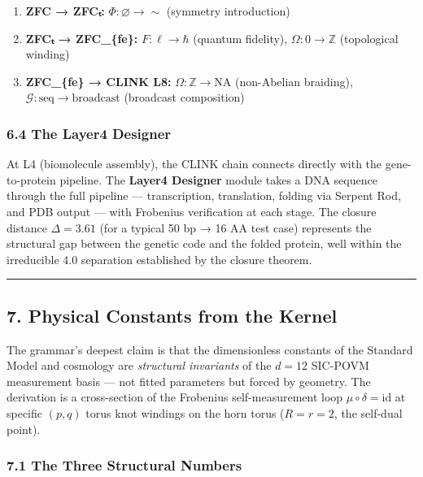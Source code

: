 \documentclass[12pt,a4paper]{article}
\begin{document}
\begin{enumerate}
\def\labelenumi{\arabic{enumi}.}
\tightlist
\item
  \textbf{ZFC → ZFCₜ:} \(\Phi: \varnothing \to \sim\) (symmetry
  introduction)
\item
  \textbf{ZFCₜ → ZFC\_\{fe\}:} \(F: \ell \to \hbar\) (quantum fidelity),
  \(\Omega: 0 \to \mathbb{Z}\) (topological winding)
\item
  \textbf{ZFC\_\{fe\} → CLINK L8:} \(\Omega: \mathbb{Z} \to \text{NA}\)
  (non-Abelian braiding),
  \(\mathcal{G}: \text{seq} \to \text{broadcast}\) (broadcast
  composition)
\end{enumerate}

\hypertarget{the-layer4-designer}{%
\subsubsection{6.4 The Layer4 Designer}\label{the-layer4-designer}}

At L4 (biomolecule assembly), the CLINK chain connects directly with the
gene-to-protein pipeline. The \textbf{Layer4 Designer} module takes a
DNA sequence through the full pipeline --- transcription, translation,
folding via Serpent Rod, and PDB output --- with Frobenius verification
at each stage. The closure distance \(\Delta = 3.61\) (for a typical 50
bp → 16 AA test case) represents the structural gap between the genetic
code and the folded protein, well within the irreducible 4.0 separation
established by the closure theorem.

\begin{center}\rule{0.5\linewidth}{0.5pt}\end{center}

\hypertarget{physical-constants-from-the-kernel}{%
\subsection{7. Physical Constants from the
Kernel}\label{physical-constants-from-the-kernel}}

The grammar's deepest claim is that the dimensionless constants of the
Standard Model and cosmology are \emph{structural invariants} of the
\(d=12\) SIC-POVM measurement basis --- not fitted parameters but forced
by geometry. The derivation is a cross-section of the Frobenius
self-measurement loop \(\mu \circ \delta = \text{id}\) at specific
\((p,q)\) torus knot windings on the horn torus (\(R = r = 2\), the
self-dual point).

\hypertarget{the-three-structural-numbers}{%
\subsubsection{7.1 The Three Structural
Numbers}\label{the-three-structural-numbers}}
\end{document}
